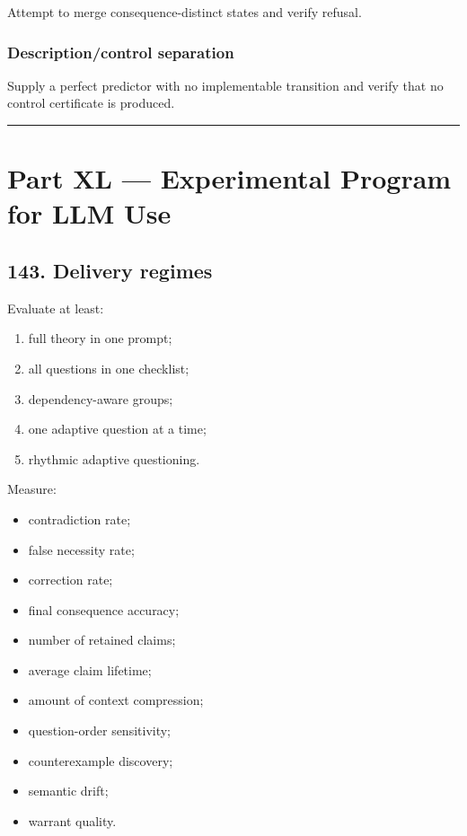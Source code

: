 \documentclass[
]{article}
\providecommand{\tightlist}{%
  \setlength{\itemsep}{0pt}\setlength{\parskip}{0pt}}
\begin{document}
Attempt to merge consequence-distinct states and verify refusal.

\subsubsection{Description/control
separation}\label{descriptioncontrol-separation}

Supply a perfect predictor with no implementable transition and verify
that no control certificate is produced.

\begin{center}\rule{0.5\linewidth}{0.5pt}\end{center}

\section{Part XL --- Experimental Program for LLM
Use}\label{part-xl-experimental-program-for-llm-use}

\subsection{143. Delivery regimes}\label{delivery-regimes}

Evaluate at least:

\begin{enumerate}
\def\labelenumi{\arabic{enumi}.}
\tightlist
\item
  full theory in one prompt;
\item
  all questions in one checklist;
\item
  dependency-aware groups;
\item
  one adaptive question at a time;
\item
  rhythmic adaptive questioning.
\end{enumerate}

Measure:

\begin{itemize}
\tightlist
\item
  contradiction rate;
\item
  false necessity rate;
\item
  correction rate;
\item
  final consequence accuracy;
\item
  number of retained claims;
\item
  average claim lifetime;
\item
  amount of context compression;
\item
  question-order sensitivity;
\item
  counterexample discovery;
\item
  semantic drift;
\item
  warrant quality.
\end{itemize}
\end{document}
